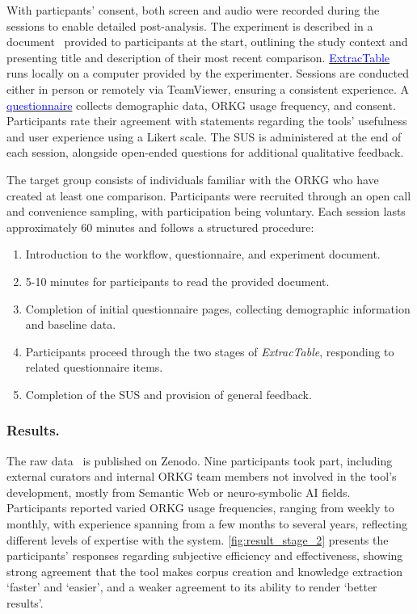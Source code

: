 \documentclass[runningheads]{llncs}
\newcommand*{\secref}[1]{\hyperref[{#1}]{\autoref*{#1}}}
\begin{document}
With particpants' consent, both screen and audio were recorded during the sessions to enable detailed post-analysis. The experiment is described in a document~\cite{John.2025} provided to participants at the start, outlining the study context and presenting title and description of their most recent comparison. \href{https://gitlab.com/TIBHannover/orkg/ExtracTable}{\textcolor{blue}{ExtracTable}} runs locally on a computer provided by the experimenter. Sessions are conducted either in person or remotely via TeamViewer, ensuring a consistent experience. A \href{https://survey.uni-hannover.de/index.php/428288?lang=en}{\textcolor{blue}{questionnaire}} collects demographic data, ORKG usage frequency, and consent. Participants rate their agreement with statements regarding the tools' usefulness and user experience using a Likert scale. The SUS is administered at the end of each session, alongside open-ended questions for additional qualitative feedback.

The target group consists of individuals familiar with the ORKG who have created at least one comparison. 
Participants were recruited through an open call and convenience sampling, with participation being voluntary. 
Each session lasts approximately 60 minutes and follows a structured procedure:
\begin{enumerate}
  \item Introduction to the workflow, questionnaire, and experiment document.
  \item 5-10 minutes for participants to read the provided document.
  \item Completion of initial questionnaire pages, collecting demographic information and baseline data.
  \item Participants proceed through the two stages of \textit{ExtracTable}, responding to related questionnaire items.
  \item Completion of the SUS and provision of general feedback.
\vspace{-0.4cm}
\end{enumerate}

\subsubsection{Results.\label{subsec:results}}
The raw data~\cite{John.2025} is published on Zenodo. Nine participants took part, including external curators and internal ORKG team members not involved in the tool’s development, mostly from Semantic Web or neuro-symbolic AI fields. Participants reported varied ORKG usage frequencies, ranging from weekly to monthly, with experience spanning from a few months to several years, reflecting different levels of expertise with the system. 
\secref{fig:result_stage_2} presents the participants' responses regarding subjective efficiency and effectiveness, showing strong agreement that the tool makes corpus creation and knowledge extraction `faster' and `easier', and a weaker agreement to its ability to render `better results'.
\end{document}
